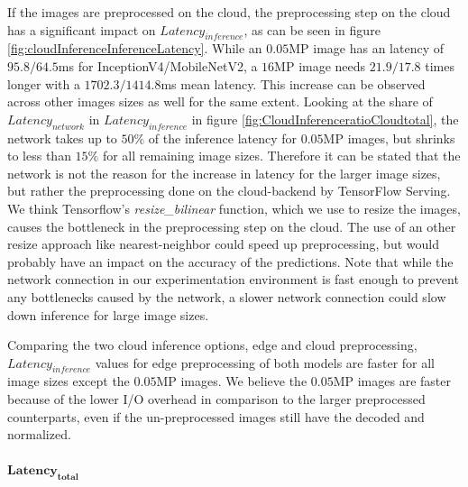 If the images are preprocessed on the cloud, the preprocessing step on the cloud has a significant impact on $Latency_{inference}$, as can be seen in figure \ref{fig:cloudInferenceInferenceLatency}.
While an $0.05$MP image has an latency of $95.8/64.5$ms for InceptionV4/MobileNetV2, a $16$MP image needs $21.9/17.8$ times longer with a $1702.3/1414.8$ms mean latency.
This increase can be observed across other images sizes as well for the same extent. 
Looking at the share of $Latency_{network}$ in $Latency_{inference}$ in figure \ref{fig:CloudInferenceratioCloudtotal}, the network takes up to $50\%$ of the inference latency for $0.05$MP images, but shrinks to less than $15\%$ for all remaining image sizes.
Therefore it can be stated that the network is not the reason for the increase in latency for the larger image sizes, but rather the preprocessing done on the cloud-backend by TensorFlow Serving.
We think Tensorflow's \emph{resize\_bilinear} function, which we use to resize the images, causes the bottleneck in the preprocessing step on the cloud.
The use of an other resize approach like nearest-neighbor could speed up preprocessing, but would probably have an impact on the accuracy of the predictions.
Note that while the network connection in our experimentation environment is fast enough to prevent any bottlenecks caused by the network, a slower network connection could slow down inference for large image sizes.

Comparing the two cloud inference options, edge and cloud preprocessing,  $Latency_{inference}$ values for edge preprocessing of both models are faster for all image sizes except the $0.05$MP images.
We believe the $0.05$MP images are faster because of the lower I/O overhead in comparison to the larger preprocessed counterparts, even if the un-preprocessed images still have the decoded and normalized.

\paragraph{$\mathbf{Latency_{total}}$}

